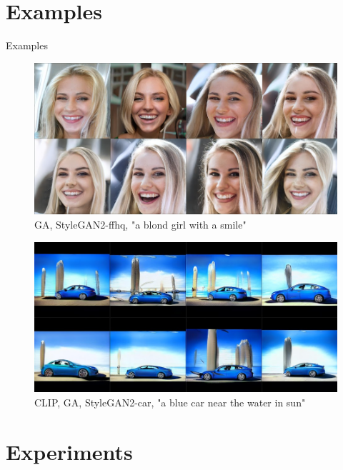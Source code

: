 \documentclass[t]{beamer}
\begin{document}
\section{Examples}

\begin{frame}[c]{Examples}
\begin{figure}[ht!]
    \centering
    \includegraphics[scale=0.2]{blondgirl.PNG}
    \caption{GA, StyleGAN2-ffhq, "a blond girl with a smile"}
\end{figure}
\begin{figure}[H]
    \centering
    \includegraphics[scale=0.2]{bluecar.png}
    \caption{CLIP, GA, StyleGAN2-car,  "a blue car near the water in sun"}
\end{figure}
\end{frame}

\section{Experiments}
\end{document}
